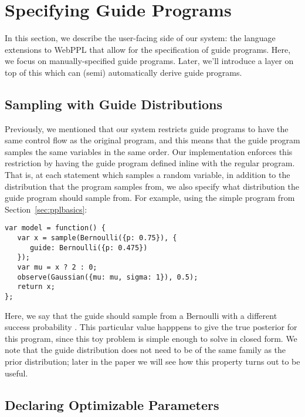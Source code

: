 \section{Specifying Guide Programs}
\label{sec:guideSpec}

In this section, we describe the user-facing side of our system: the language extensions to WebPPL that allow for the specification of guide programs.
Here, we focus on manually-specified guide programs. Later, we'll introduce a layer on top of this which can (semi) automatically derive guide programs.

\subsection{Sampling with Guide Distributions}

Previously, we mentioned that our system restricts guide programs to have the same control flow as the original program, and this means that the guide program samples the same variables in the same order.
Our implementation enforces this restriction by having the guide program defined inline with the regular program.
That is, at each  statement which samples a random variable, in addition to the distribution that the program samples from, we also specify what distribution the guide program should sample from. For example, using the simple program from Section~\ref{sec:pplbasics}:
\begin{lstlisting}
var model = function() {
   var x = sample(Bernoulli({p: 0.75}), {
      guide: Bernoulli({p: 0.475})
   });
   var mu = x ? 2 : 0;
   observe(Gaussian({mu: mu, sigma: 1}), 0.5);
   return x;
};
\end{lstlisting}
Here, we say that the guide should sample from a Bernoulli with a different success probability . This particular value happpens to give the true posterior for this program, since this toy problem is simple enough to solve in closed form.
We note that the guide distribution does not need to be of the same family as the prior distribution; later in the paper we will see how this property turns out to be useful.

\subsection{Declaring Optimizable Parameters}

